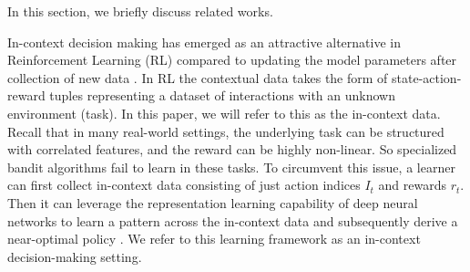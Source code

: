 In this section, we briefly discuss related works.


In-context decision making \citep{laskin2022context,lee2023supervised} has emerged as an attractive alternative in Reinforcement Learning (RL) compared to updating the model parameters after collection of new data \citep{mnih2013playing, franccois2018introduction}. 
%
In RL the contextual data takes the form
of state-action-reward tuples representing a dataset of interactions with an unknown environment (task). In this paper, we will refer to this as the in-context data.
%
%
%
Recall that in many real-world settings, the underlying task can be structured with correlated features, and the reward can be highly non-linear. So specialized bandit algorithms fail to learn in these tasks.
%
To circumvent this issue, a learner can first collect in-context data consisting of just action indices $I_t$ and rewards $r_t$. Then it can leverage the representation learning capability of deep neural networks to learn a pattern across the in-context data and subsequently derive a near-optimal policy \citep{lee2023supervised, mirchandani2023large}. We refer to this learning framework as an in-context decision-making setting.


